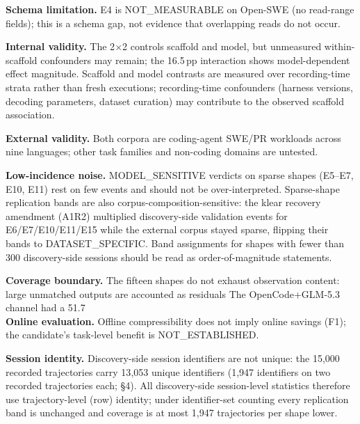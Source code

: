 ﻿\documentclass[sigconf,balance=false]{acmart}
\begin{document}
\textbf{Schema limitation.} E4 is NOT\_MEASURABLE on Open-SWE (no read-range fields); this is a schema gap, not evidence that overlapping reads do not occur.

\textbf{Internal validity.} The 2$\times$2 controls scaffold and model, but unmeasured within-scaffold confounders may remain; the 16.5\,pp interaction shows model-dependent effect magnitude. Scaffold and model contrasts are measured over recording-time strata rather than fresh executions; recording-time confounders (harness versions, decoding parameters, dataset curation) may contribute to the observed scaffold association.

\textbf{External validity.} Both corpora are coding-agent SWE/PR workloads across nine languages; other task families and non-coding domains are untested.

\textbf{Low-incidence noise.} MODEL\_SENSITIVE verdicts on sparse shapes (E5--E7, E10, E11) rest on few events and should not be over-interpreted. Sparse-shape replication bands are also corpus-composition-sensitive: the klear recovery amendment (A1R2) multiplied discovery-side validation events for E6/E7/E10/E11/E15 while the external corpus stayed sparse, flipping their bands to DATASET\_SPECIFIC. Band assignments for shapes with fewer than 300 discovery-side sessions should be read as order-of-magnitude statements.

\textbf{Coverage boundary.} The fifteen shapes do not exhaust observation content: large unmatched outputs are accounted as residuals The OpenCode+GLM-5.3 channel had a 51.7\\%

\textbf{Online evaluation.} Offline compressibility does not imply online savings (F1); the candidate's task-level benefit is NOT\_ES\-TAB\-LISHED.

\textbf{Session identity.} Discovery-side session identifiers are not unique: the 15{,}000 recorded trajectories carry 13{,}053 unique identifiers (1,947 identifiers on two recorded trajectories each; \S4). All discovery-side session-level statistics therefore use trajectory-level (row) identity; under identifier-set counting every replication band is unchanged and coverage is at most 1,947 trajectories per shape lower.
\end{document}

